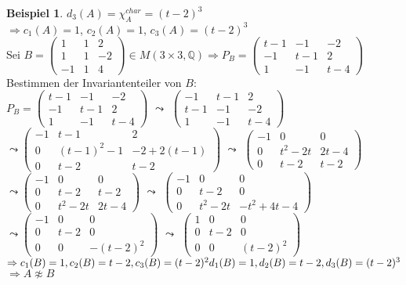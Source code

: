 \documentclass[10pt,a4paper,numbers=endperiod]{scrartcl}
\theoremstyle{definition}
\newtheorem{bsp}[satz]{Beispiel}
\def\QQ{{\mathbb Q}}
\begin{document}
\begin{bsp}
	$d_3(A) = \chi_A^{char} = (t-2)^3$\\
	$\Rightarrow c_1(A) = 1$, $c_2(A) = 1$, $c_3(A) = (t-2)^3$\\
	Sei $B = \begin{pmatrix}
	1 & 1 & 2\\
	1 & 1 & -2\\
	-1 & 1 & 4
	\end{pmatrix} \in M(3 \times 3, \QQ) \Rightarrow P_B = \begin{pmatrix}
	t-1 & -1 & -2\\
	-1 & t-1 & 2\\
	1 & -1 & t-4
	\end{pmatrix}$\\
	Bestimmen der Invariantenteiler von $B$:\\
	$P_B = \begin{pmatrix}
	t-1 & -1 & -2\\
	-1 & t-1 & 2\\
	1 & -1 & t-4
	\end{pmatrix}$ $\leadsto$ $\begin{pmatrix}
	-1 & t-1 & 2\\
	t-1 & -1 & -2\\
	1 & -1 & t-4
	\end{pmatrix}$\\
	$\leadsto \begin{pmatrix}
	-1 & t-1 & 2\\
	0  & (t-1)^2 -1 & -2 +2(t-1)\\
	0 & t-2 & t-2
	\end{pmatrix}$ $\leadsto$ $\begin{pmatrix}
	-1 & 0 & 0\\
	0 & t^2 - 2t & 2t -4\\
	0 & t-2 & t-2
	\end{pmatrix}$\\
	$\leadsto \begin{pmatrix}
	-1 & 0 & 0\\
	0 & t-2 & t-2\\
	0 & t^2-2t & 2t-4
	\end{pmatrix}$ $\leadsto$ $\begin{pmatrix}
	-1 & 0 & 0\\
	0 & t-2 & 0\\
	0 & t^2-2t & -t^2 + 4t-4
	\end{pmatrix}$\\
	$\leadsto \begin{pmatrix}
	-1 & 0 & 0\\
	0 & t-2 & 0\\
	0 & 0 & -(t-2)^2
	\end{pmatrix}$ $\leadsto$ $\begin{pmatrix}
	1 & 0 & 0\\
	0 & t-2 & 0\\
	0 & 0 & (t-2)^2
	\end{pmatrix}$\\
	$\Rightarrow c_1(B) = 1, c_2(B) = t-2, c_3(B) = (t-2)^2\\
	d_1(B) = 1, d_2(B) = t-2, d_3(B) = (t-2)^3$\\
	$\Rightarrow A \not\approx B$
\end{bsp}
\end{document}
